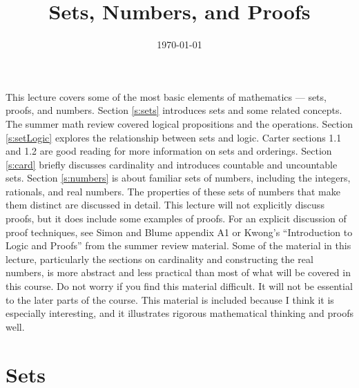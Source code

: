 \documentclass[12pt,reqno]{amsart}
\title{Sets, Numbers, and Proofs}
\date{\today}
\theoremstyle{definition}
\begin{document}
\maketitle

This lecture covers some of the most basic elements of mathematics ---
sets, proofs, and numbers. Section \ref{s:sets} introduces sets and
some related concepts. The summer math review covered logical
propositions and the operations. Section \ref{s:setLogic} explores the
relationship between sets and logic. Carter sections 1.1 and 1.2 are
good reading for more information on sets and orderings.  Section
\ref{s:card} briefly discusses cardinality and introduces countable
and uncountable sets. Section \ref{s:numbers} is about familiar sets
of numbers, including the integers, rationals, and real numbers. The
properties of these sets of numbers that make them distinct are
discussed in detail.  This lecture will not explicitly discuss proofs,
but it does include some examples of proofs. For an explicit
discussion of proof techniques, see Simon and Blume appendix A1 or
Kwong's ``Introduction to Logic and Proofs'' from the summer review
material.  Some of the material in this lecture, particularly the
sections on cardinality and constructing the real numbers, is more
abstract and less practical than most of what will be covered in this
course. Do not worry if you find this material difficult. It will not
be essential to the later parts of the course. This material is
included because I think it is especially interesting, and it
illustrates rigorous mathematical thinking and proofs well.

\section{Sets \label{s:sets}} 
\end{document}
